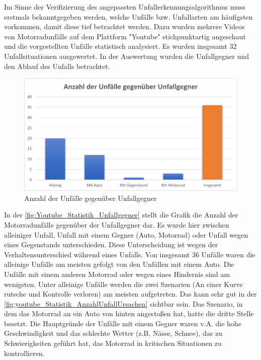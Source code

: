Im Sinne der Verifizierung des angepassten Unfallerkennungsalgorithmus muss erstmals bekanntgegeben werden, welche Unfälle bzw. Unfallarten am häufigsten vorkommen, damit diese tief betrachtet werden. Dazu wurden mehrere Videos von Motorradunfälle auf dem Plattform "Youtube" stichpunktartig angeschaut und die vorgestellten Unfälle statistisch analysiert. Es wurden insgesamt $32$ Unfallsituationen ausgewertet. In der Auswertung wurden die Unfallgegner und den Ablauf des Unfalls betrachtet. \cite{YTMotoCrashComp} \cite{YTCrazyDriverVsBiker} \cite{YTMotoCrashedAndMishaps} \cite{YTAnimalsVsBikers} \cite{YTMotoCrashesRoad}
\begin{figure}[H]
	\centering
	\includegraphics[width=\linewidth]{Bilder/youtube_Statistik_Unfallgegner.png}
	\caption{Anzahl der Unfälle gegenüber Unfallgegner}
	\label{fig:Youtube_Statistik_Unfallgegner}
\end{figure}
In der \autoref{fig:Youtube_Statistik_Unfallgegner} stellt die Grafik die Anzahl der Motorradunfälle gegenüber der Unfallgegner dar. Es wurde hier zwischen alleiniger Unfall, Unfall mit einem Gegner (Auto, Motorrad) oder Unfall wegen eines Gegenstands unterschieden. Diese Unterscheidung ist wegen der Verhaltensunterschied während eines Unfalls. Von insgesamt 36 Unfälle waren die alleinige Unfälle am meisten gefolgt von den Unfällen mit einem Auto. Die Unfälle mit einem anderen Motorrad oder wegen eines Hindernis sind am wenigsten. 
Unter alleinige Unfälle werden die zwei Szenarien (An einer Kurve rutsche und Kontrolle verloren) am meisten aufgetreten. Das kann sehr gut in der \autoref{fig:youtube_Statistik_AnzahlUnfallUrsachen} sichtbar sein. Das Szenario, in dem das Motorrad an ein Auto von hinten angestoßen hat, hatte die dritte Stelle besetzt. Die Hauptgründe der Unfälle mit einem Gegner waren v.A. die hohe Geschwindigkeit und das schlechte Wetter (z.B. Nässe, Schnee), das zu Schwierigkeiten geführt hat, das Motorrad in kritischen Situationen zu kontrollieren.

